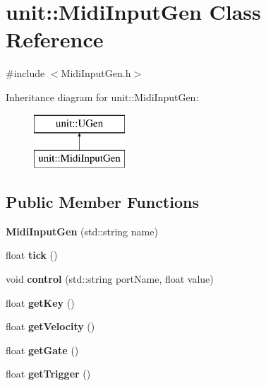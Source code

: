 \hypertarget{classunit_1_1MidiInputGen}{\section{unit\-:\-:Midi\-Input\-Gen Class Reference}
\label{classunit_1_1MidiInputGen}
}


{\ttfamily \#include $<$Midi\-Input\-Gen.\-h$>$}

Inheritance diagram for unit\-:\-:Midi\-Input\-Gen\-:\begin{figure}[H]
\begin{center}
\leavevmode
\includegraphics[height=2.000000cm]{classunit_1_1MidiInputGen}
\end{center}
\end{figure}
\subsection*{Public Member Functions}
\begin{DoxyCompactItemize}
\item 
\hypertarget{classunit_1_1MidiInputGen_a48063ea203958867e649466152ccebd8}{{\bfseries Midi\-Input\-Gen} (std\-::string name)}\label{classunit_1_1MidiInputGen_a48063ea203958867e649466152ccebd8}

\item 
\hypertarget{classunit_1_1MidiInputGen_a4633d43acd7810f80ebc3ac343ba7dd3}{float {\bfseries tick} ()}\label{classunit_1_1MidiInputGen_a4633d43acd7810f80ebc3ac343ba7dd3}

\item 
\hypertarget{classunit_1_1MidiInputGen_a97db1d2b3deac8d7dd09fce65bfdca04}{void {\bfseries control} (std\-::string port\-Name, float value)}\label{classunit_1_1MidiInputGen_a97db1d2b3deac8d7dd09fce65bfdca04}

\item 
\hypertarget{classunit_1_1MidiInputGen_aa180744b692b2ac4f8f5d11ef2adc245}{float {\bfseries get\-Key} ()}\label{classunit_1_1MidiInputGen_aa180744b692b2ac4f8f5d11ef2adc245}

\item 
\hypertarget{classunit_1_1MidiInputGen_a4e39971e955b7052df07dd9413075fc0}{float {\bfseries get\-Velocity} ()}\label{classunit_1_1MidiInputGen_a4e39971e955b7052df07dd9413075fc0}

\item 
\hypertarget{classunit_1_1MidiInputGen_a9bfcd695b0dd9a3c3b0ca8cddadd9432}{float {\bfseries get\-Gate} ()}\label{classunit_1_1MidiInputGen_a9bfcd695b0dd9a3c3b0ca8cddadd9432}

\item 
\hypertarget{classunit_1_1MidiInputGen_a4db32a60d580040a10d3b0acad2c30e3}{float {\bfseries get\-Trigger} ()}\label{classunit_1_1MidiInputGen_a4db32a60d580040a10d3b0acad2c30e3}

\end{DoxyCompactItemize}
